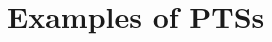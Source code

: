 \documentclass[oneside,a4paper]{article}
\numberwithin{equation}{section}
\renewcommand{\arraystretch}{2.5}
\begin{document}
\section{Examples of PTSs}\label{sec:example}

\begin{enumerate}[(i)]

\begin{comment}
\item The $\lambda$-cube (Table~\ref{tab:lambda}) consists of eight
  PTSs, where

  \begin{enumerate}
  \item $\mathcal{S} = \{\star,\square\}$
  \item $\mathcal{A} = \{(\star, \square)\}$
  \item
    $\{(\star, \star)\} \subseteq \mathcal{R} \subseteq \{(\star,
    \star), (\star, \square), (\square, \star), (\square, \square)\}$
  \end{enumerate}


\begingroup
\renewcommand*{\arraystretch}{1.5}
\begin{table}[h!]
  \centering
  \begin{tabular}{|l|llll|}
    \hline
    System & \multicolumn{4}{|c|}{Set of Rules $\mathcal{R}$} \\ \hline
    $\lambda_{\rightarrow}$ & $(\star, \star)$ & & & \\
    $\lambda2$ & $(\star, \star)$ & $(\square, \star)$ & & \\ 
    $\lambda\underbar{$\omega$}$ & $(\star, \star)$ & &  $(\square, \square)$ & \\ 
    $\lambda\omega$ & $(\star, \star)$ & $(\square, \star)$ & $(\square, \square)$ & \\ 
    $\lambda$P & $(\star, \star)$ & & & $(\star, \square)$ \\ 
    $\lambda$P2 & $(\star, \star)$ & $(\square, \star)$ & & $(\star, \square)$ \\ 
    $\lambda$P$\underbar{$\omega$}$ & $(\star, \star)$ & & $(\square, \square)$ & $(\star, \square)$ \\ 
    $\lambda$C & $(\star, \star)$ & $(\square, \star)$ & $(\square, \square)$ & $(\star, \square)$ \\ \hline
  \end{tabular}
  \caption{The systems of the $\lambda$-cube}
  \label{tab:lambda}
\end{table}
\endgroup

Note that here we slightly abuse the notation of the set of rules
$\mathcal{R}$, since in PTSs, $\mathcal{R}$ is a ternary relation,
while in the $\lambda$-cube, $\mathcal{R}$ is a binary relation
($\Pi x: A.\ B$ has the same sorts as $B$).
\end{comment}


\end{enumerate}
\end{document}
